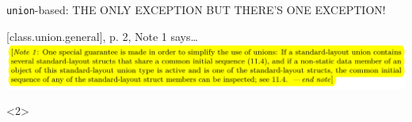 \begin{frame}[fragile]{\texttt{union}-based: THE ONLY EXCEPTION}
  \alert{BUT THERE'S ONE EXCEPTION!}
  \begin{block}{[class.union.general], p. 2, Note 1 says\ldots}
    \includegraphics[width=\textwidth]{img/cplusplus_draft/class.union.general.2.Note_1.png}
  \end{block}

  \begin{onlyenv}<2>
  \end{onlyenv}
\end{frame}

